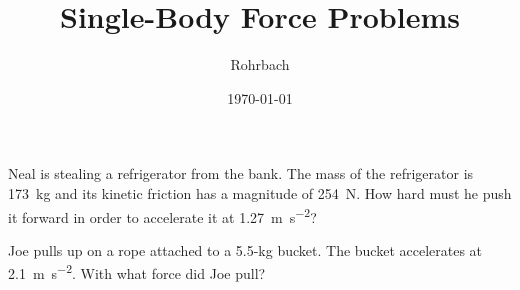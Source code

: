 \documentclass[10pt]{exam}
\title{Single-Body Force Problems}
\author{Rohrbach}
\date{\today}
\begin{document}
\maketitle

\begin{questions}
  
\question
  Neal is stealing a refrigerator from the bank.  The mass of the refrigerator is \SI{173}{\kilo\gram} and its kinetic friction has a magnitude of \SI{254}{\newton}.  How hard must he push it forward in order to accelerate it at \SI{1.27}{\meter\per\second^2}?

  \vs

\question 
  Joe pulls up on a rope attached to a 5.5-kg bucket.  The bucket accelerates at \SI{2.1}{\meter\per\second^2}.  With what force did Joe pull?

  \vspace{1em}

  \vs


\end{questions}
\end{document}
